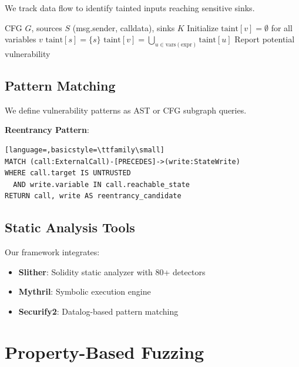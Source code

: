 \documentclass[11pt,a4paper]{article}
\theoremstyle{definition}
\begin{document}
We track data flow to identify tainted inputs reaching sensitive sinks.

\begin{algorithm}
\caption{Taint Analysis for External Input}
\begin{algorithmic}[1]
\Require CFG $G$, sources $S$ (msg.sender, calldata), sinks $K$
\State Initialize $\text{taint}[v] = \emptyset$ for all variables $v$
    \State $\text{taint}[s] = \{s\}$
\EndFor
\Repeat
            \State $\text{taint}[v] = \bigcup_{u \in \text{vars}(\text{expr})} \text{taint}[u]$
        \EndIf
            \State Report potential vulnerability
        \EndIf
    \EndFor
{}
\end{algorithmic}
\end{algorithm}

\subsection{Pattern Matching}

We define vulnerability patterns as AST or CFG subgraph queries.

\textbf{Reentrancy Pattern}:
\begin{lstlisting}[language=,basicstyle=\ttfamily\small]
MATCH (call:ExternalCall)-[PRECEDES]->(write:StateWrite)
WHERE call.target IS UNTRUSTED
  AND write.variable IN call.reachable_state
RETURN call, write AS reentrancy_candidate
\end{lstlisting}

\subsection{Static Analysis Tools}

Our framework integrates:
\begin{itemize}
    \item \textbf{Slither}: Solidity static analyzer with 80+ detectors
    \item \textbf{Mythril}: Symbolic execution engine
    \item \textbf{Securify2}: Datalog-based pattern matching
\end{itemize}

\section{Property-Based Fuzzing}
\end{document}
